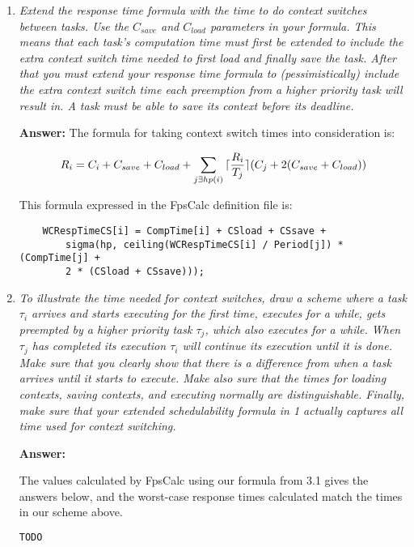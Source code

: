 \documentclass[a4paper,10pt]{article}
\DeclarePairedDelimiter{\ceil}{\lceil}{\rceil}
\newcommand{\answer}{\textbf{Answer: }}
\begin{document}
\begin{enumerate}
	\item \emph{Extend the response time formula with the time to do context switches between tasks. Use the $C_{save}$ and $C_{load}$ parameters in your formula. This means that each task's computation time must first be extended to include the extra context switch time needed to first load and finally save the task. After that you must extend your response time formula to (pessimistically) include the extra context switch time each preemption from a higher priority task will result in. A task must be able to save its context before its deadline.}
	
	\answer The formula for taking context switch times into consideration is:
	
	\begin{equation*}
	R_i = C_i + C_{save} + C_{load} + \sum_{j \exists hp(i)}{\ceil{\frac{R_i}{T_j}} (C_j + 2(C_{save} + C_{load}))}
	\end{equation*}
	
	This formula expressed in the FpsCalc definition file is:
	
	\begin{lstlisting}
	WCRespTimeCS[i] = CompTime[i] + CSload + CSsave + 
		sigma(hp, ceiling(WCRespTimeCS[i] / Period[j]) * (CompTime[j] +
		2 * (CSload + CSsave)));
	\end{lstlisting}
	
	\item \emph{To illustrate the time needed for context switches, draw a scheme where a task $\tau_i$ arrives and starts executing for the first time, executes for a while, gets preempted by a higher priority task $\tau_j$, which also executes for a while. When $\tau_j$ has completed its execution $\tau_i$ will continue its execution until it is done. Make sure that you clearly show that there is a difference from when a task arrives until it starts to execute. Make also sure that the times for loading contexts, saving contexts, and executing normally are distinguishable. Finally, make sure that your extended schedulability formula in 1 actually captures all time used for context switching.}
	
	\answer {}
	
	The values calculated by FpsCalc using our formula from 3.1 gives the answers below, and the worst-case response times calculated match the times in our scheme above.
	
\begin{lstlisting}[language=bash]
TODO
\end{lstlisting}
	

\end{enumerate}
\end{document}
